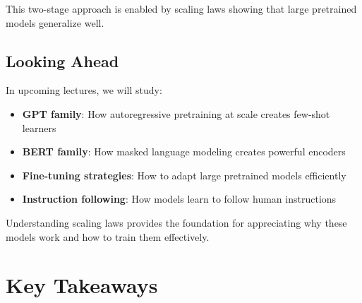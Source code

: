 \documentclass{article}
\begin{document}
This two-stage approach is enabled by scaling laws showing that large pretrained models generalize well.

\subsection{Looking Ahead}

In upcoming lectures, we will study:

\begin{itemize}
\item \textbf{GPT family}: How autoregressive pretraining at scale creates few-shot learners
\item \textbf{BERT family}: How masked language modeling creates powerful encoders
\item \textbf{Fine-tuning strategies}: How to adapt large pretrained models efficiently
\item \textbf{Instruction following}: How models learn to follow human instructions
\end{itemize}

Understanding scaling laws provides the foundation for appreciating why these models work and how to train them effectively.

\section{Key Takeaways}
\end{document}
